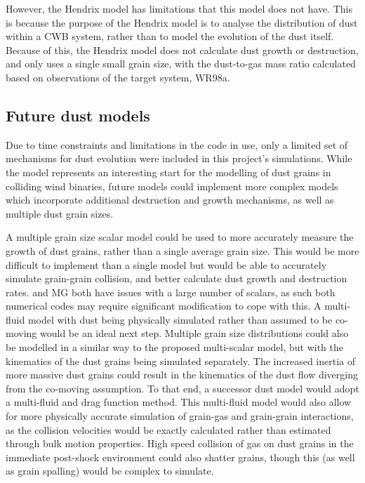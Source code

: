 However, the Hendrix model has limitations that this model does not have.
This is because the purpose of the Hendrix model is to analyse the distribution of dust within a CWB system, rather than to model the evolution of the dust itself.
Because of this, the Hendrix model does not calculate dust growth or destruction, and only uses a single small grain size, with the dust-to-gas mass ratio calculated based on observations of the target system, WR98a.

\subsection{Future dust models}


Due to time constraints and limitations in the code in use, only a limited set of mechanisms for dust evolution were included in this project's simulations.
While the \bidmas{} model represents an interesting start for the modelling of dust grains in colliding wind binaries, future models could implement more complex models which incorporate additional destruction and growth mechanisms, as well as multiple dust grain sizes.

A multiple grain size scalar model could be used to more accurately measure the growth of dust grains, rather than a single average grain size.
This would be more difficult to implement than a single model but would be able to accurately simulate grain-grain collision, and better calculate dust growth and destruction rates.
\athena{} and MG both have issues with a large number of scalars, as such both numerical codes may require significant modification to cope with this.
A multi-fluid model with dust being physically simulated rather than assumed to be co-moving would be an ideal next step.
Multiple grain size distributions could also be modelled in a similar way to the proposed multi-scalar model, but with the kinematics of the dust grains being simulated separately.
The increased inertia of more massive dust grains could result in the kinematics of the dust flow diverging from the co-moving assumption.
To that end, a successor dust model would adopt a multi-fluid and drag function method.
This multi-fluid model would also allow for more physically accurate simulation of grain-gas and grain-grain interactions, as the collision velocities would be exactly calculated rather than estimated through bulk motion properties.
High speed collision of gas on dust grains in the immediate post-shock environment could also shatter grains, though this (as well as grain spalling) would be complex to simulate. 

